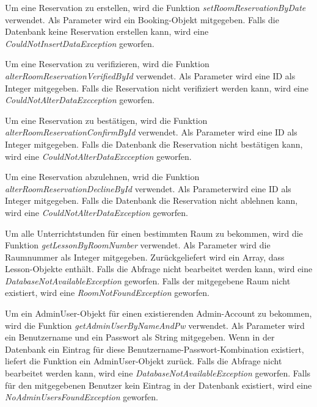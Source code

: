 Um eine Reservation zu erstellen, wird die Funktion \emph{setRoomReservationByDate} verwendet. Als Parameter wird ein Booking-Objekt mitgegeben. Falls die Datenbank keine Reservation erstellen kann, wird eine \emph{CouldNotInsertDataException} geworfen. 


Um eine Reservation zu verifizieren, wird die Funktion \emph{alterRoomReservationVerifiedById} verwendet. Als Parameter wird eine ID als Integer mitgegeben. Falls die Reservation nicht verifiziert werden kann, wird eine \emph{CouldNotAlterDataExcception} geworfen.


Um eine Reservation zu bestätigen, wird die Funktion \emph{alterRoomReservationConfirmById} verwendet. Als Parameter wird eine ID als Integer mitgegeben. Falls die Datenbank die Reservation nicht bestätigen kann, wird eine \emph{CouldNotAlterDataExcception} geworfen. 


Um eine Reservation abzulehnen, wrid die Funktion \emph{alterRoomReservationDeclineById} verwendet. Als Parameterwird eine ID als Integer mitgegeben. Falls die Datenbank die Reservation nicht ablehnen kann, wird eine \emph{CouldNotAlterDataException} geworfen.


Um alle Unterrichtstunden für einen bestimmten Raum zu bekommen, wird die Funktion \emph{getLessonByRoomNumber} verwendet. Als Parameter wird die Raumnummer als Integer mitgegeben. Zurückgeliefert wird ein Array, dass Lesson-Objekte enthält. Falls die Abfrage nicht bearbeitet werden kann, wird eine \emph{DatabaseNotAvailableException} geworfen. Falls der mitgegebene Raum nicht existiert, wird eine \emph{RoomNotFoundException} geworfen.


Um ein AdminUser-Objekt für einen existierenden Admin-Account zu bekommen, wird die Funktion \emph{getAdminUserByNameAndPw} verwendet. Als Parameter wird ein Benutzername und ein Passwort als String mitgegeben. Wenn in der Datenbank ein Eintrag für diese Benutzername-Passwort-Kombination existiert, liefert die Funktion ein AdminUser-Objekt zurück. Falls die Abfrage nicht bearbeitet werden kann, wird eine \emph{DatabaseNotAvailableException} geworfen. Falls für den mitgegebenen Benutzer kein Eintrag in der Datenbank existiert, wird eine \emph {NoAdminUsersFoundException} geworfen.
